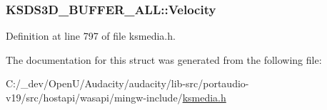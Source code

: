 \subsubsection[{\texorpdfstring{Velocity}{Velocity}}]{ K\+S\+D\+S3\+D\+\_\+\+B\+U\+F\+F\+E\+R\+\_\+\+A\+L\+L\+::\+Velocity}\hypertarget{struct_k_s_d_s3_d___b_u_f_f_e_r___a_l_l_a157d3439d85db959f452cde65d5a8997}{}\label{struct_k_s_d_s3_d___b_u_f_f_e_r___a_l_l_a157d3439d85db959f452cde65d5a8997}


Definition at line 797 of file ksmedia.\+h.



The documentation for this struct was generated from the following file\+:\begin{DoxyCompactItemize}
\item 
C\+:/\+\_\+dev/\+Open\+U/\+Audacity/audacity/lib-\/src/portaudio-\/v19/src/hostapi/wasapi/mingw-\/include/\hyperlink{ksmedia_8h}{ksmedia.\+h}\end{DoxyCompactItemize}
